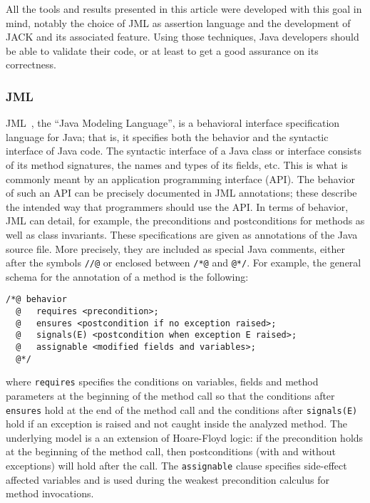 All the tools and results presented in this article were developed
with this goal in mind, notably the choice of JML as assertion
language and the development of JACK and its associated feature.
Using those techniques, Java developers should be able to validate
their code, or at least to get a good assurance on its correctness.


\subsubsection{JML}
JML~\cite{Leavens-Baker-Ruby99b,Leavens-Baker-Ruby03}, the ``Java
Modeling Language'', is a behavioral interface specification language
for Java; that is, it specifies both the behavior and the syntactic
interface of Java code.  The syntactic interface of a Java class or
interface consists of its method signatures, the names and types of
its fields, etc.  This is what is commonly meant by an application
programming interface (API).  The behavior of such an API can be
precisely documented in JML annotations; these describe the intended
way that programmers should use the API.  In terms of behavior, JML
can detail, for example, the preconditions and postconditions for
methods as well as class invariants. These specifications are given as
annotations of the Java source file. More precisely, they are included
as special Java comments, either after the symbols \lstinline!//@! or
enclosed between \lstinline!/*@! and
\lstinline[basicstyle=\normalfont\ttfamily\small\sl]!@*/!. For example,
the general schema for the annotation of a method is the following:
\begin{lstlisting}
/*@ behavior
  @   requires <precondition>;
  @   ensures <postcondition if no exception raised>;
  @   signals(E) <postcondition when exception E raised>;
  @   assignable <modified fields and variables>;
  @*/
\end{lstlisting}
where \lstinline!requires! specifies the conditions on variables, fields
and method parameters at the beginning of the method call so that the
conditions after \lstinline!ensures! hold at the end of the method
call and the conditions after \lstinline!signals(E)! hold if an
exception is raised and not caught inside the analyzed method.  The
underlying model is a an extension of Hoare-Floyd logic: if the
precondition holds at the beginning of the method call, then
postconditions (with and without exceptions) will hold after the
call. The \lstinline!assignable! clause specifies side-effect affected
variables and is used during the weakest precondition calculus for
method invocations.

